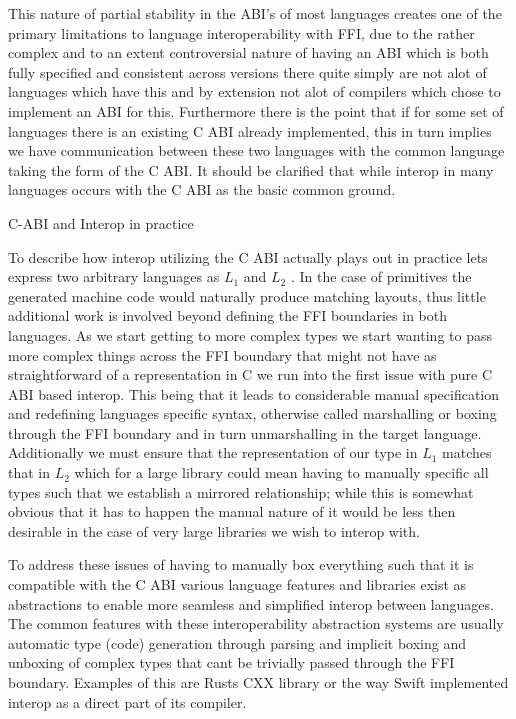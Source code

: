 This nature of partial stability in the ABI's of most languages creates one of the primary limitations to language interoperability with FFI, due to the rather complex and to an extent controversial nature of having an ABI which is both fully specified and consistent across versions there quite simply are not alot of languages which have this and by extension not alot of compilers which chose to implement an ABI for this. Furthermore there is the point that if for some set of languages there is an existing C ABI already implemented, this in turn implies we have communication between these two languages with the common language taking the form of the C ABI. It should be clarified that while interop in many languages occurs with the C ABI as the basic common ground. 

C-ABI and Interop in practice

To describe how interop utilizing the C ABI actually plays out in practice lets express two arbitrary languages as $L_1$ and $L_2$ . In the case of primitives the generated machine code would naturally produce matching layouts, thus little additional work is involved beyond defining the FFI boundaries in both languages. As we start getting to more complex types we start wanting to pass more complex things across the FFI boundary that might not have as straightforward of a representation in C we run into the first issue with pure C ABI based interop. This being that it leads to considerable manual specification and redefining languages specific syntax, otherwise called marshalling or boxing through the FFI boundary and in turn unmarshalling in the target language. Additionally we must ensure that the representation of our type in $L_1$ matches that in $L_2$ which for a large library could mean having to manually specific all types such that we establish a mirrored relationship; while this is somewhat obvious that it has to happen the manual nature of it would be less then desirable in the case of very large libraries we wish to interop with.

To address these issues of having to manually box everything such that it is compatible with the C ABI various language features and libraries exist as abstractions to enable more seamless and simplified interop between languages. The common features with these interoperability abstraction systems are usually automatic type (code) generation through parsing and implicit boxing and unboxing of complex types that cant be trivially passed through the FFI boundary. Examples of this are Rusts CXX library or the way Swift implemented interop as a direct part of its compiler.

